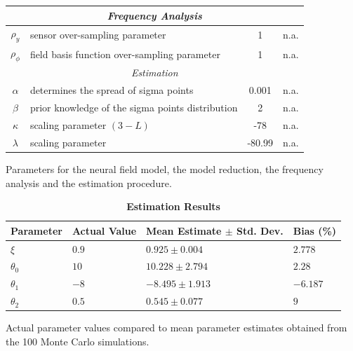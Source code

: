 \documentclass[12pt]{iopart}
\begin{document}
\begin{table}[!ht]
\begin{tabular}{|c|l|c|l|}
	\multicolumn{4}{|c|}{\emph{Frequency Analysis}}\\
	\hline
	$\rho_y$ & sensor over-sampling parameter & 1 & n.a.\\
	$\rho_\phi$ & field basis function over-sampling parameter & 1 & n.a.\\
	\hline 
	\multicolumn{4}{|c|}{\emph{Estimation}}\\
	\hline
	$\alpha$& determines the spread of sigma points & 0.001 & n.a.\\
	$\beta$& prior knowledge of the sigma points distribution & 2 & n.a.\\
	$\kappa$& scaling parameter $(3-L)$& -78 & n.a.\\
	$\lambda$& scaling parameter & -80.99 & n.a.\\
	\hline
\end{tabular}
\begin{flushleft}Parameters for the neural field model, the model reduction, the frequency analysis and the estimation procedure.
\end{flushleft}
\label{tab:Parameters}
\end{table}
	

\begin{table}[!ht]
\caption{
\bf{Estimation Results}}
\begin{tabular}{|p{1.5cm}|p{1.5cm}|p{2.5cm}|p{1.5cm}|}
		
\hline
Parameter & Actual Value & Mean Estimate $\pm$ Std. Dev. & Bias (\%) \\
\hline
$\xi$ & $0.9$ & $0.925\pm 0.004$ & $2.778$ \\
$\theta_0$ & $10$ & $10.228\pm2.794$ & $2.28$\\
$\theta_1$ & $-8$ & $-8.495\pm1.913$ & $-6.187$\\
$\theta_2$ & $0.5$ & $0.545\pm0.077$ & $9$\\
\hline
\end{tabular}
\begin{flushleft}Actual parameter values compared to mean parameter estimates obtained from the 100 Monte Carlo simulations.
\end{flushleft}
\label{tab:Parameters estimates}
\end{table}
\end{document}
